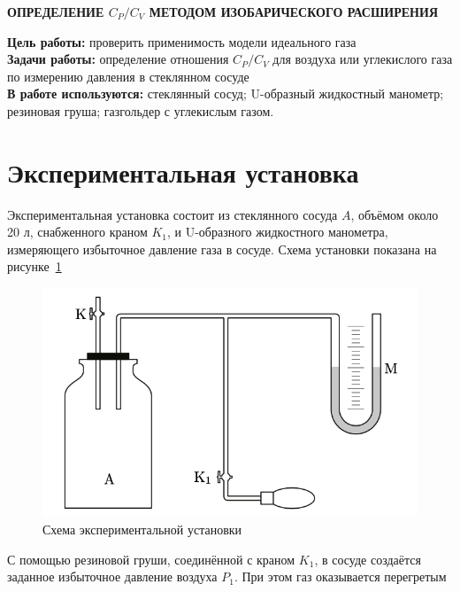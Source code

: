 \documentclass[a4paper, 14pt]{article}
\begin{document}
    \begin{center}
        \textbf{ОПРЕДЕЛЕНИЕ $C_P / C_V$ МЕТОДОМ ИЗОБАРИЧЕСКОГО РАСШИРЕНИЯ}
    \end{center}

    \noindent \textbf{Цель работы:} проверить применимость модели идеального газа \\
    \noindent \textbf{Задачи работы:} определение отношения $C_P / C_V$ для воздуха или углекислого газа по измерению
    давления в стеклянном сосуде \\
    \noindent \textbf{В работе используются:} стеклянный сосуд; U-образный жидкостный манометр; резиновая груша;
    газгольдер с углекислым газом.

     \section*{Экспериментальная установка}

    Экспериментальная установка состоит из стеклянного сосуда $A$, объёмом около 20 л, снабженного краном $K_1$, и
    U-образного жидкостного манометра, измеряющего избыточное давление газа в сосуде.
    Схема установки показана на рисунке~\ref{fig:setup}

    \begin{figure}[h]
        \centering
        \includegraphics[width=\textwidth]{setup}
        \caption{Схема экспериментальной установки}
        \label{fig:setup}
    \end{figure}

    С помощью резиновой груши, соединённой с краном $K_1$, в сосуде создаётся заданное избыточное давление воздуха $
    P_1$.
    При этом газ оказывается перегретым
\end{document}
